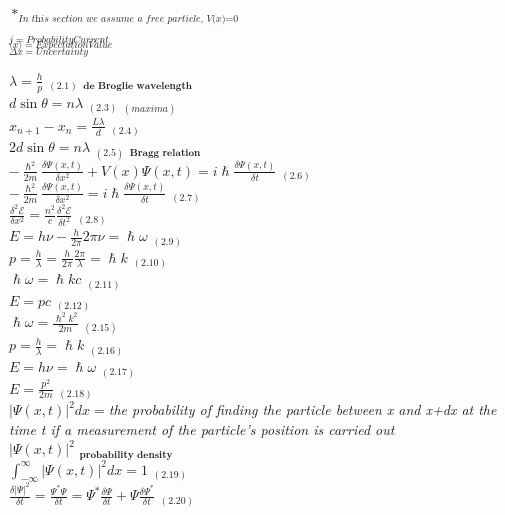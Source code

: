 \documentclass[0pt]{report}
\begin{document}
\begin{multicols}{3}
\begin{flushleft}
$*_{\textit{In this section we assume a free particle, V(x)=0}}$

\begin{multicols}{2}
$_{j=ProbabilityCurrent}$\\
$_{\langle x\rangle =ExpectationValue}$\\
$_{\Delta x=Uncertainty}$\\
\end{multicols}

$\lambda=\frac{h}{p}$ $_{(2.1)}$ $_{\textbf{de Broglie wavelength}}$\\
$d\sin\theta=n\lambda$ $_{(2.3)}$ $_{(maxima)}$\\
$x_{n+1}-x_n=\frac{L\lambda}{d}$ $_{(2.4)}$\\
$2d\sin\theta=n\lambda$ $_{(2.5)}$ $_{\textbf{Bragg relation}}$\\
$-\frac{\hslash^2}{2m}\frac{\delta\Psi(x,t)}{\delta x^2}+V(x)\Psi(x,t)=i\hslash\frac{\delta\Psi(x,t)}{\delta t}$ $_{(2.6)}$\\
$-\frac{\hslash^2}{2m}\frac{\delta\Psi(x,t)}{\delta x^2}=i\hslash\frac{\delta\Psi(x,t)}{\delta t}$ $_{(2.7)}$\\
$\frac{\delta^2\mathcal{E}}{\delta x^2}=\frac{n^2}{c}\frac{\delta^2\mathcal{E}}{\delta t^2}$ $_{(2.8)}$\\
$E=h\nu-\frac{h}{2\pi}2\pi\nu=\hslash\omega$ $_{(2.9)}$\\
$p=\frac{h}{\lambda}=\frac{h}{2\pi}\frac{2\pi}{\lambda}=\hslash k$ $_{(2.10)}$\\
$\hslash\omega=\hslash kc$ $_{(2.11)}$\\
$E=pc$ $_{(2.12)}$\\
$\hslash\omega=\frac{\hslash^2k^2}{2m}$ $_{(2.15)}$\\
$p=\frac{h}{\lambda}=\hslash k$ $_{(2.16)}$\\
$E=h\nu=\hslash\omega$ $_{(2.17)}$\\
$E=\frac{p^2}{2m}$ $_{(2.18)}$\\
$|\Psi(x,t)|^2dx=$\textit{the probability of finding the particle between x and x+dx at the time t if a measurement of the particle's position is carried out}\\
$|\Psi(x,t)|^2$ $_{\textbf{probability density}}$\\
$\int_{-\infty}^{\infty}|\Psi(x,t)|^2dx=1$ $_{(2.19)}$\\
$\frac{\delta|\Psi|^2}{\delta t}=\frac{\Psi^*\Psi}{\delta t}=\Psi^*\frac{\delta \Psi}{\delta t}+\Psi\frac{\delta \Psi^*}{\delta t}$ $_{(2.20)}$\\

\end{flushleft}
\end{multicols}
\end{document}
